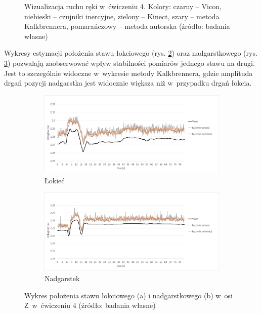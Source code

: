 \begin{savenotes}
\begin{figure}[!htb]
		\caption[Wizualizacja ruchu ręki w~ćwiczeniu 4]{Wizualizacja ruchu ręki w~ćwiczeniu 4.  Kolory: czarny -- Vicon, niebieski -- czujniki inercyjne, zielony -- Kinect, szary -- metoda Kalkbrennera, pomarańczowy -- metoda autorska (źródło: badania własne)}	
		\label{fig:experiments:four}
	\end{figure}
\end{savenotes}
																						
Wykresy estymacji położenia stawu łokciowego (rys. \ref{fig:experiments:four:elbowZ}) oraz nadgarstkowego (rys. \ref{fig:experiments:four:wristZ}) pozwalają zaobserwować wpływ stabilności pomiarów jednego stawu na drugi. Jest to szczególnie widoczne w~wykresie metody Kalkbrennera, gdzie amplituda drgań pozycji nadgarstka jest widocznie większa niż w~przypadku drgań łokcia. 
																						
\begin{savenotes}
	\begin{figure}[!htb]
		\centering
		\begin{subfigure}[b]{\textwidth}
			\centering
			\includegraphics[width=\textwidth]{images/400/3.png}		
			\caption{Łokieć}
			\label{fig:experiments:four:elbowZ}
		\end{subfigure}
		\begin{subfigure}[b]{\textwidth}
			\centering
			\includegraphics[width=\textwidth]{images/400/6.png}		
			\caption{Nadgarstek}
			\label{fig:experiments:four:wristZ}
		\end{subfigure}
		\caption[Wykres położenia stawu łokciowego i nadgarstkowego w~osi Z~w~ćwiczeniu 4]{Wykres położenia stawu łokciowego (a) i nadgarstkowego (b) w~osi Z~w~ćwiczeniu 4 (źródło: badania własne)}	
		\label{fig:experiments:four:Zaxis}
	\end{figure}
\end{savenotes}
		
